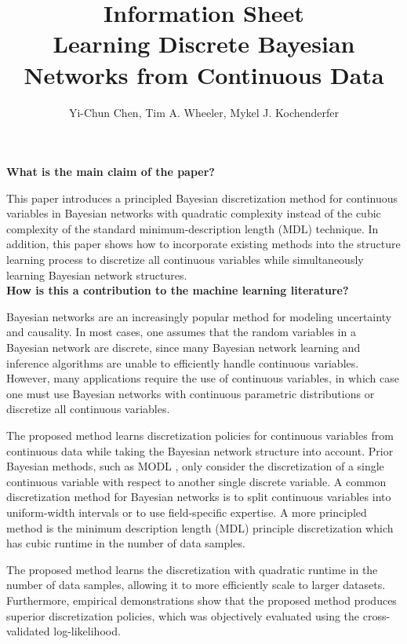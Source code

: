 \documentclass{article}
\title{Information Sheet \\ {\large Learning Discrete Bayesian Networks from Continuous Data}}
\author{\normalsize Yi-Chun Chen, Tim A. Wheeler, Mykel J. Kochenderfer}
\date{}
\begin{document}
\maketitle

\noindent
\textbf{What is the main claim of the paper?}

This paper introduces a principled Bayesian discretization method for continuous variables in Bayesian networks with quadratic complexity instead of the cubic complexity of the standard minimum-description length (MDL) technique.
In addition, this paper shows how to incorporate existing methods into the structure learning process to discretize all continuous variables while simultaneously learning Bayesian network structures.\\[0em]

\noindent
\textbf{How is this a contribution to the machine learning literature?}

Bayesian networks are an increasingly popular method for modeling uncertainty and causality.
In most cases, one assumes that the random variables in a Bayesian network are discrete, since many Bayesian network learning and inference algorithms are unable to efficiently handle continuous variables.
However, many applications require the use of continuous variables, in which case one must use Bayesian networks with continuous parametric distributions or discretize all continuous variables.

The proposed method learns discretization policies for continuous variables from continuous data while taking the Bayesian network structure into account.
Prior Bayesian methods, such as MODL \citep{Boulle_2006, Lustgarten_2011}, only consider the discretization of a single continuous variable with respect to another single discrete variable.
A common discretization method for Bayesian networks is to split continuous variables into uniform-width intervals or to use field-specific expertise.
A more principled method is the minimum description length (MDL) principle discretization \citep{Friedman_1996} which has cubic runtime in the number of data samples.

The proposed method learns the discretization with quadratic runtime in the number of data samples, allowing it to more efficiently scale to larger datasets.
Furthermore, empirical demonstrations show that the proposed method produces superior discretization policies, which was objectively evaluated using the cross-validated log-likelihood.\\[0em]
\end{document}
